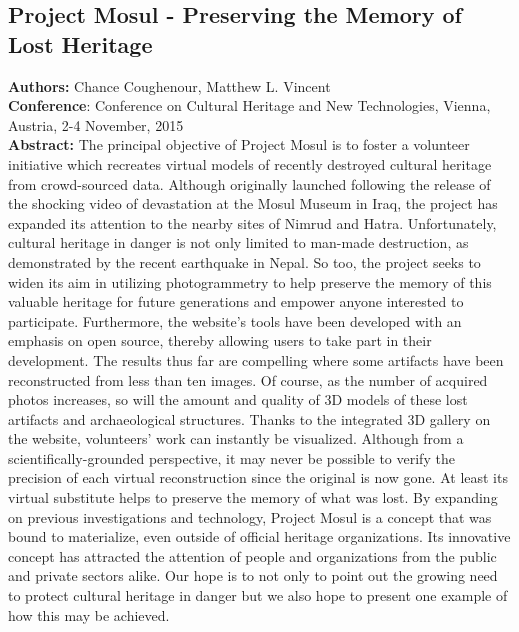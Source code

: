 \subsection{Project Mosul - Preserving the Memory of Lost Heritage}

\textbf{Authors:}  Chance Coughenour, Matthew L. Vincent
\\
\textbf{Conference}: Conference on Cultural Heritage and New Technologies, Vienna, Austria, 2-4 November, 2015
\\
\textbf{Abstract:} The principal objective of Project Mosul is to foster a volunteer initiative which recreates virtual models of recently destroyed cultural heritage from crowd-sourced data. Although originally launched following the release of the shocking video of devastation at the Mosul Museum in Iraq, the project has expanded its attention to the nearby sites of Nimrud and Hatra. Unfortunately, cultural heritage in danger is not only limited to man-made destruction, as demonstrated by the recent earthquake in Nepal. So too, the project seeks to widen its aim in utilizing photogrammetry to help preserve the memory of this valuable heritage for future generations and empower anyone interested to participate. Furthermore, the website’s tools have been developed with an emphasis on open source, thereby allowing users to take part in their development.
The results thus far are compelling where some artifacts have been reconstructed from less than ten images. Of course, as the number of acquired photos increases, so will the amount and quality of 3D models of these lost artifacts and archaeological structures. Thanks to the integrated 3D gallery on the website, volunteers’ work can instantly be visualized. Although from a scientifically-grounded perspective, it may never be possible to verify the precision of each virtual reconstruction since the original is now gone. At least its virtual substitute helps to preserve the memory of what was lost.
By expanding on previous investigations and technology, Project Mosul is a concept that was bound to materialize, even outside of official heritage organizations. Its innovative concept has attracted the attention of people and organizations from the public and private sectors alike. Our hope is to not only to point out the growing need to protect cultural heritage in danger but we also hope to present one example of how this may be achieved.

